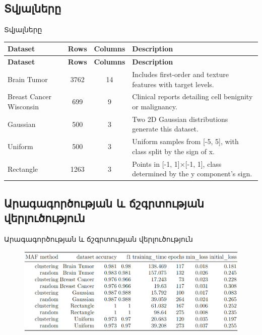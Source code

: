 \documentclass[aspectratio=169]{beamer}
\begin{document}
\subsection{{Տվյալները}}
\begin{frame}{Տվյալները}
{\rm
\begin{longtable}{|>{\raggedright\arraybackslash}p{3cm}|c|c|>{\raggedright\arraybackslash}p{5cm}|}
\hline
\textbf{Dataset} & \textbf{Rows} & \textbf{Columns} & \textbf{Description} \\ \hline
\endfirsthead
\hline
\textbf{Dataset} & \textbf{Rows} & \textbf{Columns} & \textbf{Description} \\ \hline
\endhead
Brain Tumor & 3762 & 14 & Includes first-order and texture features with target levels. \\ \hline
Breast Cancer Wisconsin & 699 & 9 & Clinical reports detailing cell benignity or malignancy. \\ \hline
Gaussian & 500 & 3 & Two 2D Gaussian distributions generate this dataset. \\ \hline
Uniform & 500 & 3 & Uniform samples from [-5, 5], with class split by the sign of x. \\ \hline
Rectangle & 1263 & 3 & Points in [-1, 1]×[-1, 1], class determined by the y component's sign. \\ \hline
\end{longtable}
    }
\end{frame}

\subsection{Արագագործության և ճշգրտության վերլուծություն}
\begin{frame}{Արագագործության և ճշգրտության վերլուծություն}
\begin{figure}
    \centering
    \includegraphics[width=0.95\linewidth]{../../fig/acc_speedup_table.png}
    \label{fig:enter-label}
\end{figure}
\end{frame}
\end{document}
